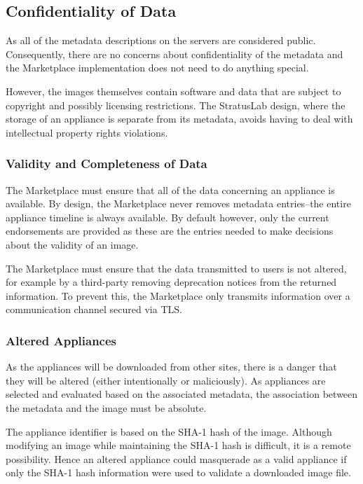 \subsection{Confidentiality of Data}

As all of the metadata descriptions on the servers are considered
public.  Consequently, there are no concerns about confidentiality of
the metadata and the Marketplace implementation does not need to do
anything special.

However, the images themselves contain software and data that are
subject to copyright and possibly licensing restrictions.  The
StratusLab design, where the storage of an appliance is separate from
its metadata, avoids having to deal with intellectual property rights
violations.

\subsubsection{Validity and Completeness of Data}

The Marketplace must ensure that all of the data concerning an
appliance is available.  By design, the Marketplace never removes
metadata entries--the entire appliance timeline is always available.
By default however, only the current endorsements are provided as
these are the entries needed to make decisions about the validity of
an image.  

The Marketplace must ensure that the data transmitted to users is not
altered, for example by a third-party removing deprecation notices
from the returned information.  To prevent this, the Marketplace only
transmits information over a communication channel secured via TLS\@. 

\subsubsection{Altered Appliances}

As the appliances will be downloaded from other sites, there is a danger
that they will be altered (either intentionally or maliciously).  As
appliances are selected and evaluated based on the associated
metadata, the association between the metadata and the image must be
absolute. 

The appliance identifier is based on the SHA-1 hash of the image.
Although modifying an image while maintaining the SHA-1 hash is
difficult, it is a remote possibility.  Hence an altered appliance
could masquerade as a valid appliance if only the SHA-1 hash
information were used to validate a downloaded image file.

